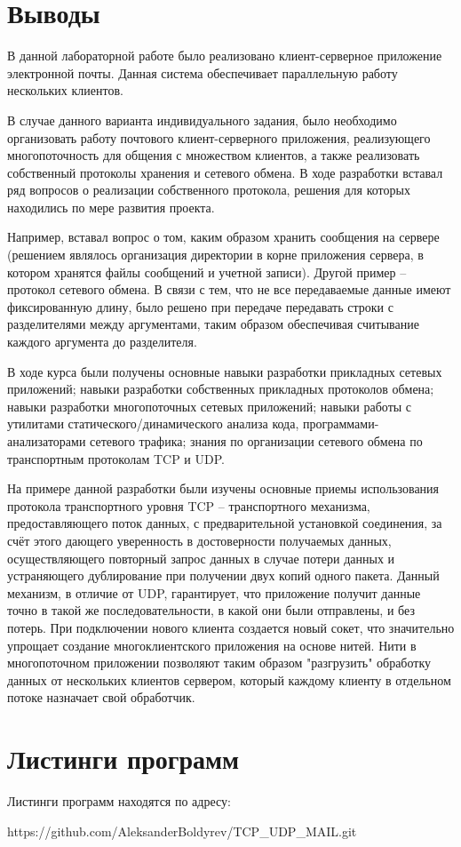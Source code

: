 \section{Выводы}
В данной лабораторной работе было реализовано клиент-серверное приложение электронной почты. Данная система обеспечивает параллельную работу нескольких клиентов.

В случае данного варианта индивидуального задания, было необходимо организовать работу почтового клиент-серверного приложения, реализующего многопоточность для общения с множеством клиентов, а также реализовать собственный протоколы хранения и сетевого обмена. В ходе разработки вставал ряд вопросов о реализации собственного протокола, решения для которых находились по мере развития проекта. 

Например, вставал вопрос о том, каким образом хранить сообщения на сервере (решением являлось организация директории в корне приложения сервера, в котором хранятся файлы сообщений и учетной записи). Другой пример – протокол сетевого обмена. В связи с тем, что не все передаваемые данные имеют фиксированную длину, было решено при передаче передавать строки с разделителями между аргументами, таким образом обеспечивая считывание каждого аргумента до разделителя.

В ходе курса были получены основные навыки разработки прикладных сетевых приложений; навыки разработки собственных прикладных протоколов обмена; навыки разработки многопоточных сетевых приложений; навыки работы с утилитами статического/динамического анализа кода, программами-анализаторами сетевого трафика; знания по организации сетевого обмена по транспортным протоколам TCP и UDP. 

На примере данной разработки были изучены основные приемы использования протокола транспортного уровня TCP – транспортного механизма, предоставляющего поток данных, с предварительной установкой соединения, за счёт этого дающего уверенность в достоверности получаемых данных, осуществляющего повторный запрос данных в случае потери данных и устраняющего дублирование при получении двух копий одного пакета. Данный механизм, в отличие от UDP, гарантирует, что приложение получит данные точно в такой же последовательности, в какой они были отправлены, и без потерь. При подключении нового клиента создается новый сокет, что значительно упрощает создание многоклиентского приложения на основе нитей. Нити в многопоточном приложении позволяют таким образом "разгрузить" обработку данных от нескольких клиентов сервером, который каждому клиенту в отдельном потоке назначает свой обработчик.

\section{Листинги программ}

Листинги программ находятся по адресу: 

https://github.com/AleksanderBoldyrev/TCP\_UDP\_MAIL.git



